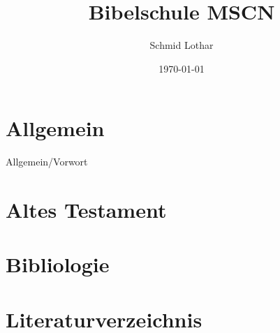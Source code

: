 \documentclass{scrreprt}
\title{Bibelschule MSCN}
\author{Schmid Lothar}
\date{\today}
\begin{document}
\maketitle
\tableofcontents

\newpage
\chapter{Allgemein}
 {Allgemein/Vorwort}
\newpage
\chapter{Altes Testament}

\newpage
\chapter{Bibliologie}

\newpage
\chapter{Literaturverzeichnis}

\end{document}

